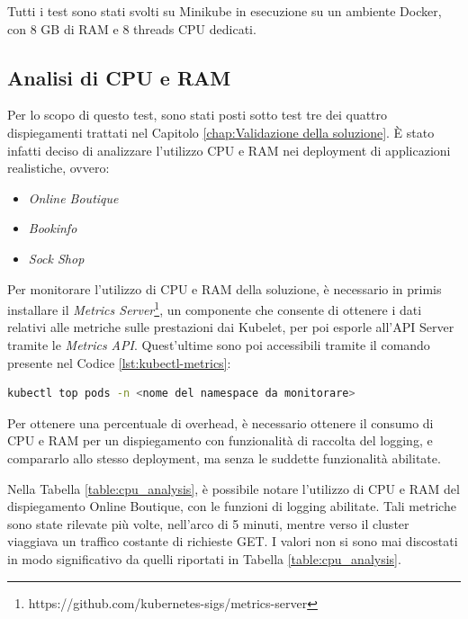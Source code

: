 Tutti i test sono stati svolti su Minikube in esecuzione su un ambiente Docker, con 8 GB di RAM e 8 threads CPU dedicati.

\subsection{Analisi di CPU e RAM}
Per lo scopo di questo test, sono stati posti sotto test tre dei quattro dispiegamenti trattati nel Capitolo \ref{chap:Validazione della soluzione}. È stato infatti deciso di analizzare l'utilizzo CPU e RAM nei deployment di applicazioni realistiche, ovvero:
\begin{itemize}
    \item \textit{Online Boutique}
    \item \textit{Bookinfo}
    \item \textit{Sock Shop}
\end{itemize}

Per monitorare l'utilizzo di CPU e RAM della soluzione, è necessario in primis installare il \textit{Metrics Server}\footnote{https://github.com/kubernetes-sigs/metrics-server}, un componente che consente di ottenere i dati relativi alle metriche sulle prestazioni dai Kubelet, per poi esporle all'API Server tramite le \textit{Metrics API}. Quest'ultime sono poi accessibili tramite il comando presente nel Codice \ref{lst:kubectl-metrics}:
\begin{lstlisting}[caption={Comando per la rilevazione di metriche.}, label=lst:kubectl-metrics, language=bash]
    kubectl top pods -n <nome del namespace da monitorare>
\end{lstlisting}

Per ottenere una percentuale di overhead, è necessario ottenere il consumo di CPU e RAM per un dispiegamento con funzionalità di raccolta del logging, e compararlo allo stesso deployment, ma senza le suddette funzionalità abilitate.

Nella Tabella \ref{table:cpu_analysis}, è possibile notare l'utilizzo di CPU e RAM del dispiegamento Online Boutique, con le funzioni di logging abilitate. Tali metriche sono state rilevate più volte, nell'arco di 5 minuti, mentre verso il cluster viaggiava un traffico costante di richieste GET. I valori non si sono mai discostati in modo significativo da quelli riportati in Tabella \ref{table:cpu_analysis}.

